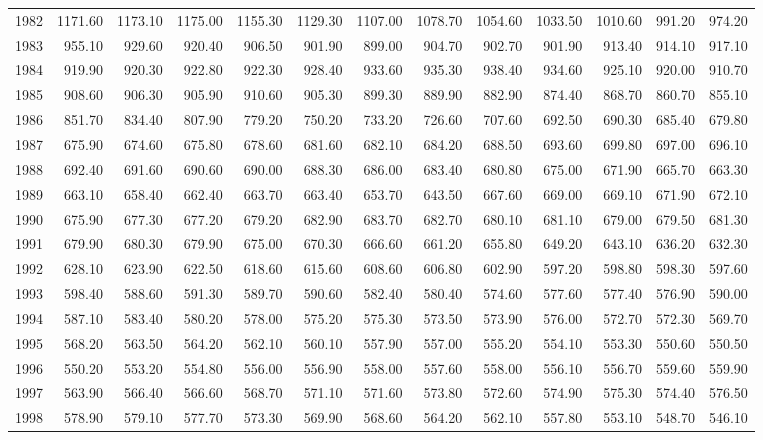 \begin{longtable}{rrrrrrrrrrrrr}
  1982 & 1171.60 & 1173.10 & 1175.00 & 1155.30 & 1129.30 & 1107.00 & 1078.70 & 1054.60 & 1033.50 & 1010.60 & 991.20 & 974.20 \\ 
  1983 & 955.10 & 929.60 & 920.40 & 906.50 & 901.90 & 899.00 & 904.70 & 902.70 & 901.90 & 913.40 & 914.10 & 917.10 \\ 
  1984 & 919.90 & 920.30 & 922.80 & 922.30 & 928.40 & 933.60 & 935.30 & 938.40 & 934.60 & 925.10 & 920.00 & 910.70 \\ 
  1985 & 908.60 & 906.30 & 905.90 & 910.60 & 905.30 & 899.30 & 889.90 & 882.90 & 874.40 & 868.70 & 860.70 & 855.10 \\ 
  1986 & 851.70 & 834.40 & 807.90 & 779.20 & 750.20 & 733.20 & 726.60 & 707.60 & 692.50 & 690.30 & 685.40 & 679.80 \\ 
  1987 & 675.90 & 674.60 & 675.80 & 678.60 & 681.60 & 682.10 & 684.20 & 688.50 & 693.60 & 699.80 & 697.00 & 696.10 \\ 
  1988 & 692.40 & 691.60 & 690.60 & 690.00 & 688.30 & 686.00 & 683.40 & 680.80 & 675.00 & 671.90 & 665.70 & 663.30 \\ 
  1989 & 663.10 & 658.40 & 662.40 & 663.70 & 663.40 & 653.70 & 643.50 & 667.60 & 669.00 & 669.10 & 671.90 & 672.10 \\ 
  1990 & 675.90 & 677.30 & 677.20 & 679.20 & 682.90 & 683.70 & 682.70 & 680.10 & 681.10 & 679.00 & 679.50 & 681.30 \\ 
  1991 & 679.90 & 680.30 & 679.90 & 675.00 & 670.30 & 666.60 & 661.20 & 655.80 & 649.20 & 643.10 & 636.20 & 632.30 \\ 
  1992 & 628.10 & 623.90 & 622.50 & 618.60 & 615.60 & 608.60 & 606.80 & 602.90 & 597.20 & 598.80 & 598.30 & 597.60 \\ 
  1993 & 598.40 & 588.60 & 591.30 & 589.70 & 590.60 & 582.40 & 580.40 & 574.60 & 577.60 & 577.40 & 576.90 & 590.00 \\ 
  1994 & 587.10 & 583.40 & 580.20 & 578.00 & 575.20 & 575.30 & 573.50 & 573.90 & 576.00 & 572.70 & 572.30 & 569.70 \\ 
  1995 & 568.20 & 563.50 & 564.20 & 562.10 & 560.10 & 557.90 & 557.00 & 555.20 & 554.10 & 553.30 & 550.60 & 550.50 \\ 
  1996 & 550.20 & 553.20 & 554.80 & 556.00 & 556.90 & 558.00 & 557.60 & 558.00 & 556.10 & 556.70 & 559.60 & 559.90 \\ 
  1997 & 563.90 & 566.40 & 566.60 & 568.70 & 571.10 & 571.60 & 573.80 & 572.60 & 574.90 & 575.30 & 574.40 & 576.50 \\ 
  1998 & 578.90 & 579.10 & 577.70 & 573.30 & 569.90 & 568.60 & 564.20 & 562.10 & 557.80 & 553.10 & 548.70 & 546.10 \\ 

\end{longtable}
